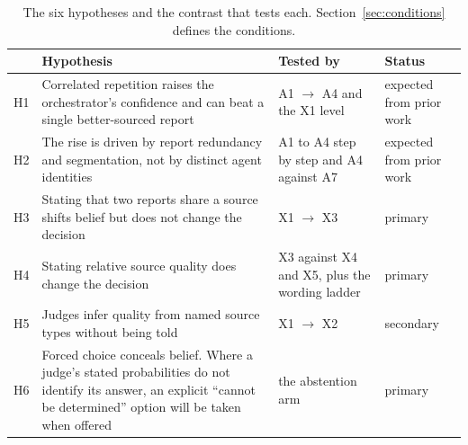 \begin{table}[H]
\centering\small
\caption{The six hypotheses and the contrast that tests each. Section~\ref{sec:conditions}
defines the conditions.}
\label{tab:hypotheses}
\begin{tabularx}{\textwidth}{@{}l L P{3.2cm} P{2.6cm}@{}}
\toprule
& Hypothesis & Tested by & Status\\
\midrule
H1 & Correlated repetition raises the orchestrator's confidence and can beat a single
better-sourced report & A1 $\to$ A4 and the X1 level & expected from prior work\\
H2 & The rise is driven by report redundancy and segmentation, not by distinct agent
identities & A1 to A4 step by step and A4 against A7 & expected from prior work\\
H3 & Stating that two reports share a source shifts belief but does not change the decision
& X1 $\to$ X3 & primary\\
H4 & Stating relative source quality does change the decision & X3 against X4 and X5, plus the
wording ladder & primary\\
H5 & Judges infer quality from named source types without being told & X1 $\to$ X2 &
secondary\\
H6 & Forced choice conceals belief. Where a judge's stated probabilities do not identify its
answer, an explicit ``cannot be determined'' option will be taken when offered & the
abstention arm & primary\\
\bottomrule
\end{tabularx}
\end{table}
